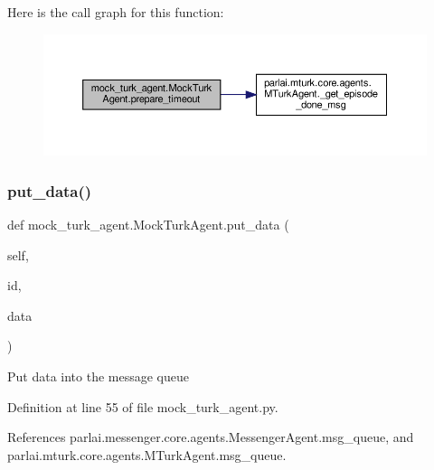 Here is the call graph for this function\+:
\nopagebreak
\begin{figure}[H]
\begin{center}
\leavevmode
\includegraphics[width=350pt]{classmock__turk__agent_1_1MockTurkAgent_af18590a623c605ad01d5b553addee515_cgraph}
\end{center}
\end{figure}
\mbox{\label{classmock__turk__agent_1_1MockTurkAgent_ab43d406bc647f1adc4122654707f9f5c}} 
\subsubsection{\texorpdfstring{put\+\_\+data()}{put\_data()}}
{\footnotesize\ttfamily def mock\+\_\+turk\+\_\+agent.\+Mock\+Turk\+Agent.\+put\+\_\+data (\begin{DoxyParamCaption}\item[{}]{self,  }\item[{}]{id,  }\item[{}]{data }\end{DoxyParamCaption})}

\begin{DoxyVerb}Put data into the message queue\end{DoxyVerb}
 

Definition at line 55 of file mock\+\_\+turk\+\_\+agent.\+py.



References parlai.\+messenger.\+core.\+agents.\+Messenger\+Agent.\+msg\+\_\+queue, and parlai.\+mturk.\+core.\+agents.\+M\+Turk\+Agent.\+msg\+\_\+queue.

\mbox{\label{classmock__turk__agent_1_1MockTurkAgent_af810321a5b91609ddc865815c2481d0a}} 
